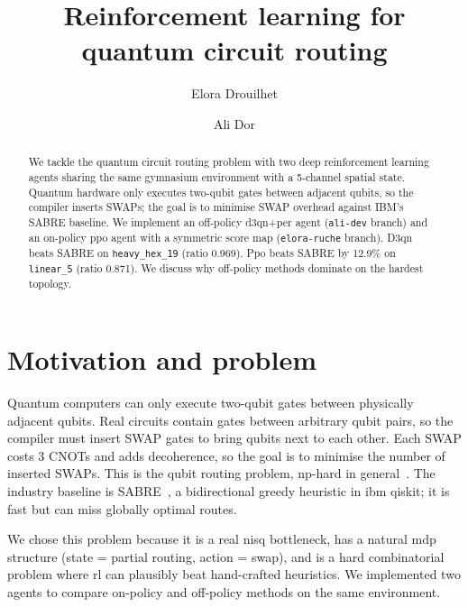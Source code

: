 \documentclass[runningheads]{llncs}
\begin{document}
\title{Reinforcement learning for quantum circuit routing}

\author{Elora Drouilhet \and Ali Dor}

\maketitle

\begin{abstract}
We tackle the quantum circuit routing problem with two deep reinforcement learning agents sharing the same gymnasium environment with a 5-channel spatial state. Quantum hardware only executes two-qubit gates between adjacent qubits, so the compiler inserts SWAPs; the goal is to minimise SWAP overhead against IBM's SABRE baseline. We implement an off-policy d3qn+per agent (\texttt{ali-dev} branch) and an on-policy ppo agent with a symmetric score map (\texttt{elora-ruche} branch). D3qn beats SABRE on \texttt{heavy\_hex\_19} (ratio 0.969). Ppo beats SABRE by 12.9\% on \texttt{linear\_5} (ratio 0.871). We discuss why off-policy methods dominate on the hardest topology.

\end{abstract}

\section{Motivation and problem}

Quantum computers can only execute two-qubit gates between physically adjacent qubits. Real circuits contain gates between arbitrary qubit pairs, so the compiler must insert SWAP gates to bring qubits next to each other. Each SWAP costs 3 CNOTs and adds decoherence, so the goal is to minimise the number of inserted SWAPs. This is the qubit routing problem, np-hard in general~\cite{siraichi2018}. The industry baseline is SABRE~\cite{li2019sabre}, a bidirectional greedy heuristic in ibm qiskit; it is fast but can miss globally optimal routes.

We chose this problem because it is a real nisq bottleneck, has a natural mdp structure (state = partial routing, action = swap), and is a hard combinatorial problem where rl can plausibly beat hand-crafted heuristics. We implemented two agents to compare on-policy and off-policy methods on the same environment.
\end{document}
